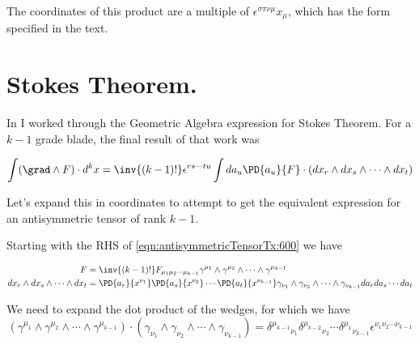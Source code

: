 The coordinates of this product are a multiple of $\epsilon^{\sigma \pi \nu \mu } x_\mu$, which has the form specified in the text.

\section{Stokes Theorem.}

In \cite{stokesNoTensor} I worked through the Geometric Algebra expression for Stokes Theorem.  For a $k-1$ grade blade, the final result of that work was

\begin{equation}\label{eqn:antisymmetricTensorTx:600}
\int
( \grad \wedge F ) \cdot d^k x 
=
\inv{(k-1)!} \epsilon^{ r s \cdots t u } \int da_u \PD{a_{u}}{F} \cdot 
(dx_r \wedge dx_s \wedge \cdots \wedge dx_t)
\end{equation}

Let's expand this in coordinates to attempt to get the equivalent expression for an antisymmetric tensor of rank $k-1$.

Starting with the RHS of \ref{eqn:antisymmetricTensorTx:600} we have

\begin{align}\label{eqn:antisymmetricTensorTx:610}
F &= \inv{(k-1)!}
F_{\mu_1 \mu_2 \cdots \mu_{k-1} }
\gamma^{\mu_1} \wedge \gamma^{ \mu_2 } \wedge \cdots \wedge \gamma^{\mu_{k-1}} 
\\
dx_r \wedge dx_s \wedge \cdots \wedge dx_t &=
\PD{a_r}{x^{\nu_1}}
\PD{a_s}{x^{\nu_2}}
\cdots
\PD{a_t}{x^{\nu_{k-1}}}
\gamma_{\nu_1} \wedge \gamma_{ \nu_2 } \wedge \cdots \wedge \gamma_{\nu_{k-1}}
da_r da_s \cdots da_t
\end{align}

We need to expand the dot product of the wedges, for which we have
\begin{equation}\label{eqn:antisymmetricTensorTx:620}
\left( 
\gamma^{\mu_1} \wedge \gamma^{ \mu_2 } \wedge \cdots \wedge \gamma^{\mu_{k-1}} 
\right) 
\cdot
\left( 
\gamma_{\nu_1} \wedge \gamma_{ \nu_2 } \wedge \cdots \wedge \gamma_{\nu_{k-1}}
\right) 
=
{\delta^{\mu_{k-1}}}_{\nu_1}  {\delta^{ \mu_{k-2} }}_{\nu_2}  \cdots  {\delta^{\mu_{1}} }_{\nu_{k-1}}
\epsilon^{\nu_1 \nu_2 \cdots \nu_{k-1}}
\end{equation}

